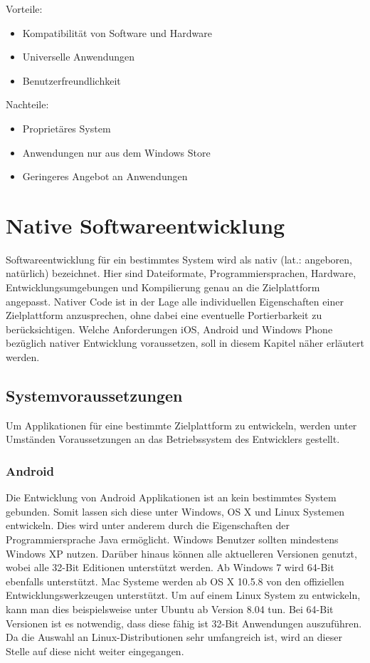 Vorteile:
\begin{itemize}
	\item Kompatibilität von Software und Hardware
	\item Universelle Anwendungen
	\item Benutzerfreundlichkeit
\end{itemize}

Nachteile:
\begin{itemize}
	\item Proprietäres System
	\item Anwendungen nur aus dem Windows Store
	\item Geringeres Angebot an Anwendungen
\end{itemize}
\citep{wp_pros_cons}


\chapter{Native Softwareentwicklung}
Softwareentwicklung für ein bestimmtes System wird als nativ (lat.: angeboren, natürlich) bezeichnet. Hier sind Dateiformate, Programmiersprachen, Hardware, Entwicklungsumgebungen und Kompilierung genau an die Zielplattform angepasst. Nativer Code ist in der Lage alle individuellen Eigenschaften einer Zielplattform anzusprechen, ohne dabei eine eventuelle Portierbarkeit zu berücksichtigen.
\citep{native_software}
Welche Anforderungen iOS, Android und Windows Phone bezüglich nativer Entwicklung voraussetzen, soll in diesem Kapitel näher erläutert werden.

\section{Systemvoraussetzungen}
Um Applikationen für eine bestimmte Zielplattform zu entwickeln, werden unter Umständen Voraussetzungen an das Betriebssystem des Entwicklers gestellt.

\subsection{Android}
Die Entwicklung von Android Applikationen ist an kein bestimmtes System gebunden. Somit lassen sich diese unter Windows, OS X und Linux Systemen entwickeln. Dies wird unter anderem durch die Eigenschaften der Programmiersprache Java ermöglicht.
Windows Benutzer sollten mindestens Windows XP nutzen. Darüber hinaus können alle aktuelleren Versionen genutzt, wobei alle 32-Bit Editionen unterstützt werden. Ab Windows 7 wird 64-Bit ebenfalls unterstützt.
Mac Systeme werden ab OS X 10.5.8 von den offiziellen Entwicklungswerkzeugen unterstützt.
Um auf einem Linux System zu entwickeln, kann man dies beispielsweise unter Ubuntu ab Version 8.04 tun. Bei 64-Bit Versionen ist es notwendig, dass diese fähig ist 32-Bit Anwendungen auszuführen. Da die Auswahl an Linux-Distributionen sehr umfangreich ist, wird an dieser Stelle auf diese nicht weiter eingegangen.
\citep{android_sdk_requirements}

